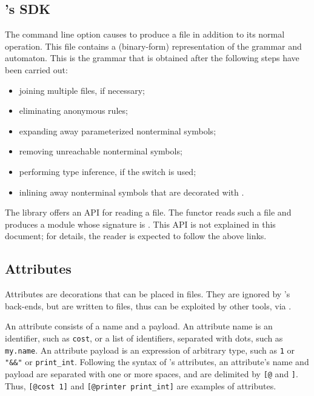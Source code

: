 \documentclass[onecolumn,11pt,nocopyrightspace,preprint]{sigplanconf}
\begin{document}
\subsection{\menhir's SDK}
\label{sec:sdk}

The command line option \ocmly causes \menhir to produce a \cmly file in
addition to its normal operation. This file contains a (binary-form)
representation of the grammar and automaton. This is the grammar that
is obtained after the following steps have been carried out:
\begin{itemize}
\item joining multiple \mly files, if necessary; %
\item eliminating anonymous rules;
\item expanding away parameterized nonterminal symbols;
\item removing unreachable nonterminal symbols;
\item performing \ocaml type inference, if the \oinfer switch is used;
\item inlining away nonterminal symbols that are decorated with \dinline.
\end{itemize}

The library \menhirsdk offers an API for reading a \cmly file.
The functor 
reads such a file and produces a module whose signature is
.
This API is not explained in this document; for details,
the reader is expected to follow the above links.


\subsection{Attributes}
\label{sec:attributes}

Attributes are decorations that can be placed in \mly files.
They are ignored by \menhir's back-ends,
but are written to \cmly files,
thus can be exploited by other tools, via \menhirsdk.

An attribute consists of a name and a payload. An attribute name is an \ocaml
identifier, such as \texttt{cost}, or a list of \ocaml identifiers, separated
with dots, such as \texttt{my.name}. An attribute payload is an \ocaml
expression of arbitrary type, such as \texttt{1} or \verb+"&&"+ or \verb+print_int+.
Following the syntax of \ocaml's attributes, an attribute's name and payload
are separated with one or more spaces, and are delimited by \verb+[@+ and
\verb+]+. Thus, \verb+[@cost 1]+ and \verb+[@printer print_int]+ are examples
of attributes.
\end{document}
